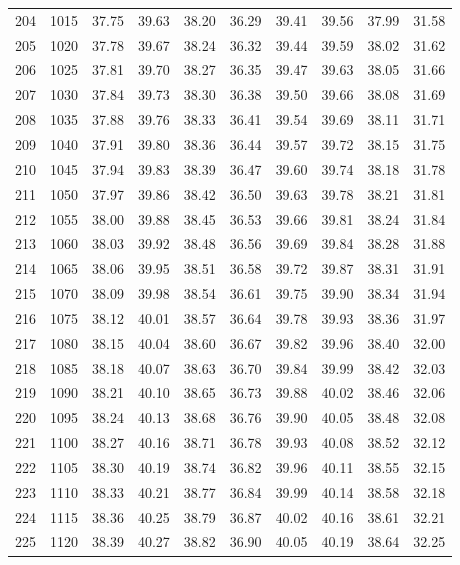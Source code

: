 \begin{longtable}{rrllllllll}
204 & 1015 & 37.75 & 39.63 & 38.20 & 36.29 & 39.41 & 39.56 & 37.99 & 31.58 \\ 
205 & 1020 & 37.78 & 39.67 & 38.24 & 36.32 & 39.44 & 39.59 & 38.02 & 31.62 \\ 
206 & 1025 & 37.81 & 39.70 & 38.27 & 36.35 & 39.47 & 39.63 & 38.05 & 31.66 \\ 
207 & 1030 & 37.84 & 39.73 & 38.30 & 36.38 & 39.50 & 39.66 & 38.08 & 31.69 \\ 
208 & 1035 & 37.88 & 39.76 & 38.33 & 36.41 & 39.54 & 39.69 & 38.11 & 31.71 \\ 
209 & 1040 & 37.91 & 39.80 & 38.36 & 36.44 & 39.57 & 39.72 & 38.15 & 31.75 \\ 
210 & 1045 & 37.94 & 39.83 & 38.39 & 36.47 & 39.60 & 39.74 & 38.18 & 31.78 \\ 
211 & 1050 & 37.97 & 39.86 & 38.42 & 36.50 & 39.63 & 39.78 & 38.21 & 31.81 \\ 
212 & 1055 & 38.00 & 39.88 & 38.45 & 36.53 & 39.66 & 39.81 & 38.24 & 31.84 \\ 
213 & 1060 & 38.03 & 39.92 & 38.48 & 36.56 & 39.69 & 39.84 & 38.28 & 31.88 \\ 
214 & 1065 & 38.06 & 39.95 & 38.51 & 36.58 & 39.72 & 39.87 & 38.31 & 31.91 \\ 
215 & 1070 & 38.09 & 39.98 & 38.54 & 36.61 & 39.75 & 39.90 & 38.34 & 31.94 \\ 
216 & 1075 & 38.12 & 40.01 & 38.57 & 36.64 & 39.78 & 39.93 & 38.36 & 31.97 \\ 
217 & 1080 & 38.15 & 40.04 & 38.60 & 36.67 & 39.82 & 39.96 & 38.40 & 32.00 \\ 
218 & 1085 & 38.18 & 40.07 & 38.63 & 36.70 & 39.84 & 39.99 & 38.42 & 32.03 \\ 
219 & 1090 & 38.21 & 40.10 & 38.65 & 36.73 & 39.88 & 40.02 & 38.46 & 32.06 \\ 
220 & 1095 & 38.24 & 40.13 & 38.68 & 36.76 & 39.90 & 40.05 & 38.48 & 32.08 \\ 
221 & 1100 & 38.27 & 40.16 & 38.71 & 36.78 & 39.93 & 40.08 & 38.52 & 32.12 \\ 
222 & 1105 & 38.30 & 40.19 & 38.74 & 36.82 & 39.96 & 40.11 & 38.55 & 32.15 \\ 
223 & 1110 & 38.33 & 40.21 & 38.77 & 36.84 & 39.99 & 40.14 & 38.58 & 32.18 \\ 
224 & 1115 & 38.36 & 40.25 & 38.79 & 36.87 & 40.02 & 40.16 & 38.61 & 32.21 \\ 
225 & 1120 & 38.39 & 40.27 & 38.82 & 36.90 & 40.05 & 40.19 & 38.64 & 32.25 \\ 

\end{longtable}
